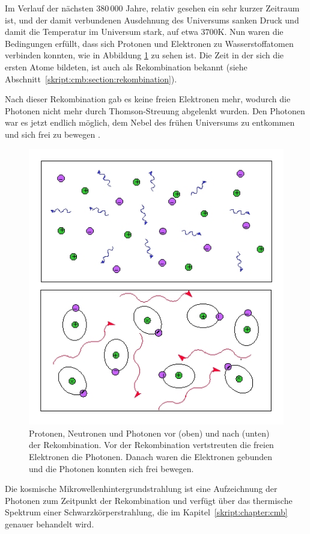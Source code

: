 Im Verlauf der nächsten 380\,000 Jahre, relativ gesehen ein sehr kurzer 
Zeitraum ist, und der damit verbundenen Ausdehnung des Universums sanken Druck 
und damit die Temperatur im Universum stark, auf etwa $3700 \text{K}$.
Nun waren die Bedingungen erfüllt, dass sich Protonen und Elektronen zu 
Wasserstoffatomen verbinden konnten, wie in Abbildung \ref{fig:recombination} 
zu sehen ist. Die Zeit in der sich die ersten Atome bildeten, ist auch als 
Rekombination bekannt (siehe Abschnitt~\ref{skript:cmb:section:rekombination}).

Nach dieser Rekombination gab es keine freien Elektronen mehr, wodurch die 
Photonen nicht mehr durch Thomson-Streuung abgelenkt wurden.
Den Photonen war es jetzt endlich möglich, dem Nebel des frühen Universums zu 
entkommen und sich frei zu bewegen \cite{cmb:recombination}.
\begin{figure}
	\centering
	\includegraphics[scale=0.5]{cmb/images/recombination.jpg}
	\caption{Protonen, Neutronen und Photonen vor (oben) und nach (unten) der 
		Rekombination. Vor der Rekombination vertstreuten die freien Elektronen 
		die Photonen. Danach waren die Elektronen gebunden und die Photonen 
		konnten sich frei bewegen.}
	\label{fig:recombination}
\end{figure}
Die kosmische Mikrowellenhintergrundstrahlung ist eine Aufzeichnung der 
Photonen zum Zeitpunkt der Rekombination und verfügt über das thermische 
Spektrum einer Schwarzkörperstrahlung, die im Kapitel~\ref{skript:chapter:cmb} 
genauer behandelt wird.

